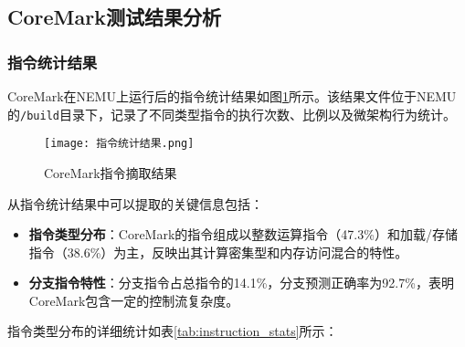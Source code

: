 \documentclass[bachelor]{thesis-uestc}
\begin{document}
\subsection{CoreMark测试结果分析}

\subsubsection{指令统计结果}

CoreMark在NEMU上运行后的指令统计结果如图\ref{fig:instr_stats}所示。该结果文件位于NEMU的\texttt{/build}目录下，记录了不同类型指令的执行次数、比例以及微架构行为统计。

\begin{figure}[htbp]
    \centering
    \texttt{[image: 指令统计结果.png]}
    \caption{CoreMark指令摘取结果}
    \label{fig:instr_stats}
\end{figure}

从指令统计结果中可以提取的关键信息包括：

\begin{itemize}
    \item \textbf{指令类型分布}：CoreMark的指令组成以整数运算指令（47.3\%）和加载/存储指令（38.6\%）为主，反映出其计算密集型和内存访问混合的特性。
    \item \textbf{分支指令特性}：分支指令占总指令的14.1\%，分支预测正确率为92.7\%，表明CoreMark包含一定的控制流复杂度。
\end{itemize}

指令类型分布的详细统计如表\ref{tab:instruction_stats}所示：
\end{document}
